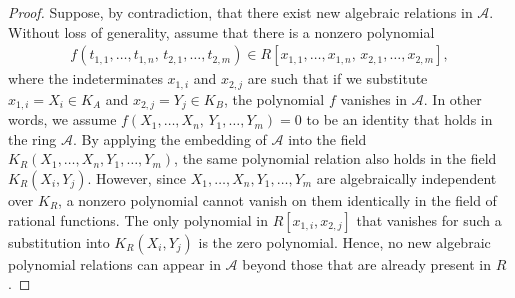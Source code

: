 \documentclass[11pt]{amsart}
\theoremstyle{definition}
\theoremstyle{plain}
\theoremstyle{conclusion}
\begin{document}
\begin{proof}
Suppose, by contradiction, that there exist new algebraic relations in $\mathcal{A}$. Without loss of generality, assume that there is a nonzero polynomial \begin{align*}
    f(t_{1,1}, \ldots, t_{1,n}, \, t_{2,1}, \ldots, t_{2,m}) \in R[x_{1,1},\ldots,x_{1,n}, \, x_{2,1},\ldots,x_{2,m}],
\end{align*}  where the indeterminates $x_{1,i}$ and $x_{2,j}$ are such that if we substitute $x_{1,i} = X_i \in K_A$  and $x_{2,j} = Y_j \in K_B$, the polynomial $f$ vanishes in $\mathcal{A}$. %
In other words, we assume $ f(X_1,\ldots,X_n,\, Y_1,\ldots,Y_m) = 0  $ to be an identity that holds in the ring $\mathcal{A}$. By applying the embedding of $\mathcal{A}$ into the field $K_R(X_1,\ldots,X_n,Y_1,\ldots,Y_m)$, the same polynomial relation also holds in the field $K_R(X_i, Y_j)$. However, since $X_1,\ldots,X_n,Y_1,\ldots,Y_m$ are algebraically independent over $K_R$, a nonzero polynomial cannot vanish on them identically in the field of rational functions. The only polynomial in $R[x_{1,i}, x_{2,j}]$ that vanishes for such a substitution into $K_R(X_i,Y_j)$ is the zero polynomial. Hence, no new algebraic polynomial relations can appear in $\mathcal{A}$ beyond those that are already present in $R$. %




\end{proof}
\end{document}
